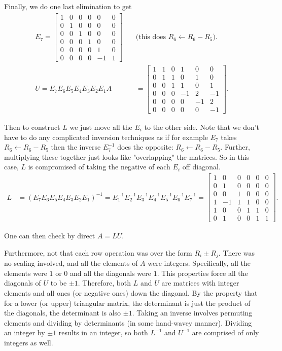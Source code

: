 \documentclass[11pt]{article}
\begin{document}
{Finally, we do one last elimination to get
\begin{align*}
E_7=
\left[
\begin{array}{rrrrrr}
 1& 0& 0& 0& 0& 0\\
 0& 1& 0& 0& 0& 0\\
 0& 0& 1& 0& 0& 0\\
 0& 0& 0& 1& 0& 0\\
 0& 0& 0& 0& 1& 0\\
 0& 0& 0& 0&-1& 1
\end{array}
\right]
\quad&\text{(this does }R_6\leftarrow R_6-R_5\text{)}.\\
U=E_7E_6E_5E_4E_3E_2E_1A
&=
\left[
\begin{array}{rrrrrr}
 1& 1& 0& 1& 0& 0\\
 0& 1& 1& 0& 1& 0\\
 0& 0& 1& 1& 0& 1\\
 0& 0& 0&-1& 2&-1\\
 0& 0& 0& 0&-1& 2\\
 0& 0& 0& 0& 0&-1
\end{array}
\right].
\end{align*}


Then to construct $L$ we just move all the $E_i$ to the other side. Note that we don't have to do any complicated inversion techniques as if for example $E_7$ takes $R_6 \leftarrow R_6 - R_5$ then the inverse $E_7^{-1}$ does the opposite: $R_6 \leftarrow R_6 - R_5$. Further, multiplying these together just looks like "overlapping" the matrices. So in this case, $L$ is compromised of taking the negative of each $E_i$ off diagonal.
\begin{align*}
L
&=(E_7E_6E_5E_4E_3E_2E_1)^{-1}
  =E_1^{-1}E_2^{-1}E_3^{-1}E_4^{-1}E_5^{-1}E_6^{-1}E_7^{-1}
=
\left[
\begin{array}{rrrrrr}
 1& 0& 0& 0& 0& 0\\
 0& 1& 0& 0& 0& 0\\
 0& 0& 1& 0& 0& 0\\
 1&-1& 1& 1& 0& 0\\
 1& 0& 0& 1& 1& 0\\
 0& 1& 0& 0& 1& 1
\end{array}
\right].
\end{align*}

One can then check by direct $
A = LU.$

Furthermore, not that each row operation was over the form $R_i \pm R_j$. There was no scaling involved, and all the elements of $A$ were integers. Specifically, all the elements were $1$ or $0$ and all the diagonals were $1$. This properties force all the diagonals of $U$ to be $\pm 1$. Therefore, both $L$ and $U$ are matrices with integer elements and all ones (or negative ones) down the diagonal. By the property that for a lower (or upper) triangular matrix, the determinant is just the product of the diagonals, the determinant is also $\pm 1$. Taking an inverse involves permuting elements and dividing by determinants (in some hand-wavey manner). Dividing an integer by $\pm 1$ results in an integer, so both $L^{-1}$ and $U^{-1}$ are comprised of only integers as well. 

}
\end{document}
